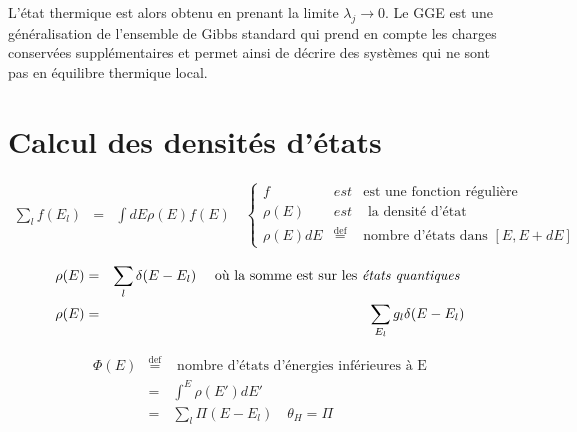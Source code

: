 	
	L'état thermique est alors obtenu en prenant la limite $\lambda_j \rightarrow 0$. Le GGE est une généralisation de l'ensemble de Gibbs standard qui prend en compte les charges conservées supplémentaires et permet ainsi de décrire des systèmes qui ne sont pas en équilibre thermique local.\\
	
	
	
	\section{Calcul des densités d'états}
        
        \begin{exer}             
            \centering            
        \end{exer}
                            
        
        
            \begin{eqnarray*}
                \sum_l f(E_l) & = & \int dE \rho(E) f(E) \quad \left \{ \begin{array}{rcl} f & est & \mbox{est une fonction régulière} \\ \rho(E) & est & \mbox{ la densité d'état} \\ \rho(E) dE & \overset{\mbox{def}}{=} & \mbox{nombre d'états dans } [E,E+dE]\end{array}\right.
            \end{eqnarray*}
            
            \begin{eqnarray*}
                \rho(E) & = & \sum_l \delta( E - E_l ) \quad \mbox{ où la somme est sur les {\em états quantiques }} \\
                \rho(E) & = & \sum_{E_l} g_l\delta( E - E_l )
            \end{eqnarray*}
            
            \begin{eqnarray*}
                \Phi (E) & \overset{\mbox{def}}{=} & \mbox{ nombre d'états d'énergies inférieures à E} \\
                & = &  \int^{E} \rho(E') dE' \\
                & = & \sum_l \Pi ( E - E_l )  \quad \theta_H = \Pi 
            \end{eqnarray*}
            

